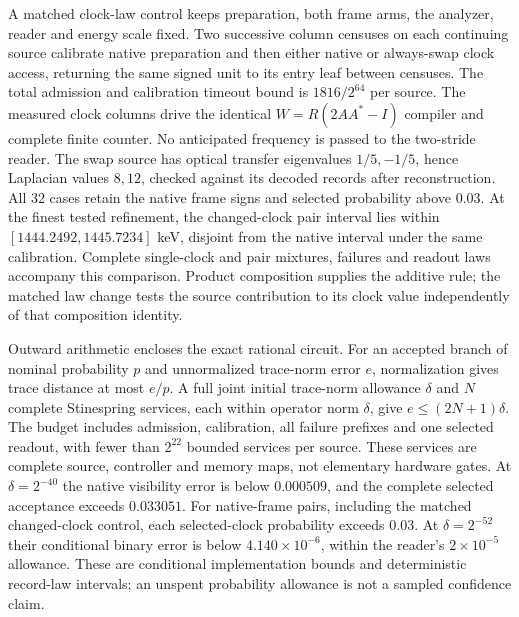 A matched clock-law control keeps preparation, both frame arms, the analyzer,
reader and energy scale fixed. Two successive column censuses on each
continuing source calibrate native preparation and then either native or
always-swap clock access, returning the same signed unit to its entry leaf
between censuses. The total admission and calibration timeout bound is
$1816/2^{64}$ per source. The measured clock columns drive the identical
$W=R(2AA^*-I)$ compiler and complete finite counter. No anticipated frequency
is passed to the two-stride reader. The swap source has optical transfer
eigenvalues $1/5,-1/5$, hence Laplacian values $8,12$, checked against its
decoded records after reconstruction. All $32$ cases retain the native
frame signs and selected probability above $0.03$. At the finest tested
refinement, the changed-clock pair interval lies within
$[1444.2492,1445.7234]$ keV, disjoint from the native interval under the same
calibration. Complete single-clock and pair mixtures, failures and readout
laws accompany this comparison. Product composition supplies the additive
rule; the matched law change tests the source contribution to its clock
value independently of that composition identity.

Outward arithmetic encloses the exact rational circuit. For an accepted
branch of nominal probability $p$ and unnormalized trace-norm error $e$,
normalization gives trace distance at most $e/p$. A full joint initial
trace-norm allowance $\delta$ and $N$ complete Stinespring services, each
within operator norm $\delta$, give $e\leq(2N+1)\delta$. The budget includes
admission, calibration, all failure prefixes and one selected readout, with
fewer than $2^{22}$ bounded services per source. These services are complete
source, controller and memory maps, not elementary hardware gates.
At $\delta=2^{-40}$ the native visibility error is below $0.000509$, and
the complete selected acceptance exceeds $0.033051$. For native-frame pairs, including the matched changed-clock control, each
selected-clock probability exceeds $0.03$. At $\delta=2^{-52}$ their conditional
binary error is below
$4.140\times10^{-6}$, within the reader's $2\times10^{-5}$ allowance.
These are conditional implementation bounds and deterministic record-law
intervals; an unspent probability allowance is not a sampled confidence claim.
